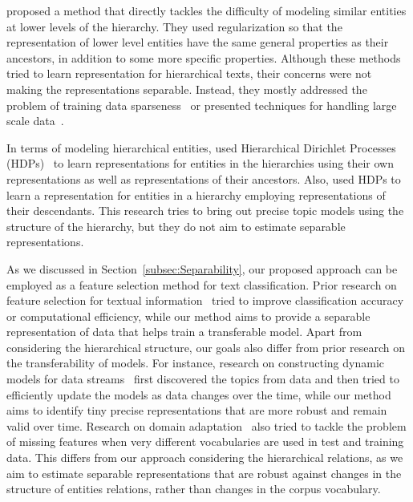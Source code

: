 \citet{Zhou:2011} proposed a method that directly tackles the difficulty of modeling similar entities at lower levels of the hierarchy. They used regularization so that the representation of lower level entities have the same general properties as their ancestors, in addition to some more specific properties. 
%
Although these methods tried to learn representation for hierarchical texts, their concerns were not making the representations separable. Instead, they mostly addressed the problem of training data sparseness~\citep{Ha-Thuc:2011,Song:2014,McCallum:1998} or presented techniques for handling large scale data~\citep{Gopal:2013,Oh:2011,Xue:2008,Ha-Thuc:2011}.

In terms of modeling hierarchical entities, \citet{Kim:2013} used Hierarchical Dirichlet Processes (HDPs)~\citep{Teh:2006} to learn representations for entities in the hierarchies using their own representations as well as representations of their ancestors.  Also, \citet{Zavitsanos:2011} used HDPs to learn a representation for entities in a hierarchy employing representations of their descendants. This research tries to bring out precise topic models using the structure of the hierarchy, but they do not aim to estimate separable representations.  

As we discussed in Section~\ref{subsec:Separability}, our proposed approach can be employed as a feature selection method for text classification. Prior research on feature selection for textual information~\citep{SIGIR-Workshop-2010,Forman:2003} tried to improve classification accuracy or computational efficiency, while our method aims to provide a separable representation of data that helps train a transferable model. 
Apart from considering the hierarchical structure, our goals also differ from prior research on the transferability of models. For instance, research on constructing dynamic models for data streams~\citep{Yao:2009,Blei:2006} first discovered the topics from data and then tried to efficiently update the models as data changes over the time, while our method aims to identify tiny precise representations that are more robust and remain valid over time.  Research on domain adaptation~\citep{Xue:2008:plsa,Chen:2011} also tried to tackle the problem of missing features when very different vocabularies are used in test and training data.  This differs from our approach considering the hierarchical relations, as we aim to estimate separable representations that are robust against changes in the structure of entities relations, rather than changes in the corpus vocabulary.